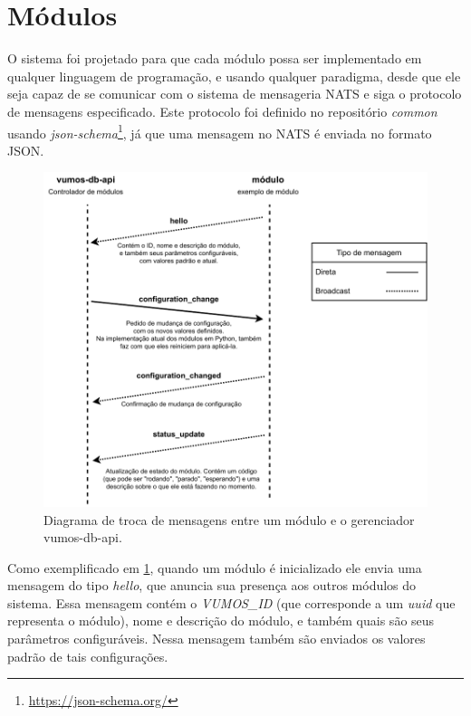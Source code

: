     
\section{Módulos}
    
    O sistema foi projetado para que cada módulo possa ser implementado em qualquer linguagem de programação, e usando qualquer paradigma, desde que ele seja capaz de se comunicar com o sistema de mensageria NATS e siga o protocolo de mensagens especificado. Este protocolo foi definido no repositório \textit{common} usando \textit{json-schema}\footnote{\url{https://json-schema.org/}}, já que uma mensagem no NATS é enviada no formato JSON. 
    
    \begin{figure}[H]
        \includegraphics[scale=0.8]{figuras/vumos-module-communication.drawio.pdf}
        \caption{Diagrama de troca de mensagens entre um módulo e o gerenciador vumos-db-api.\label{fig:module-communication}}
    \end{figure}
    
    Como exemplificado em \ref{fig:module-communication}, quando um módulo é inicializado ele envia uma mensagem do tipo \textit{hello}, que anuncia sua presença aos outros módulos do
    sistema. Essa mensagem contém o \textit{VUMOS\_ID} (que corresponde a um 
    \textit{uuid} que representa o módulo), nome e descrição do 
    módulo, e também quais são seus parâmetros configuráveis. Nessa mensagem também são enviados os valores padrão de tais configurações.
    

